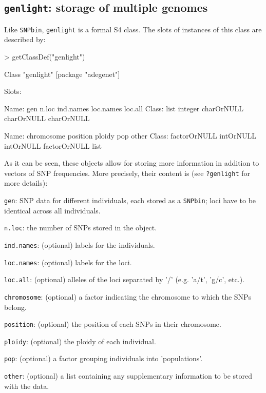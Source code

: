 \documentclass{article}
\newcommand{\code}[1]{{{\tt #1}}}
\begin{document}
\subsection{\code{genlight}: storage of multiple genomes}

Like \texttt{SNPbin}, \texttt{genlight} is a formal S4 class.
The slots of instances of this class are described by:
\begin{Schunk}
\begin{Sinput}
> getClassDef("genlight")
\end{Sinput}
\begin{Soutput}
Class "genlight" [package "adegenet"]

Slots:
                                                                       
Name:           gen        n.loc    ind.names    loc.names      loc.all
Class:         list      integer   charOrNULL   charOrNULL   charOrNULL
                                                                       
Name:    chromosome     position       ploidy          pop        other
Class: factorOrNULL    intOrNULL    intOrNULL factorOrNULL         list
\end{Soutput}
\end{Schunk}
As it can be seen, these objects allow for storing more information in addition to vectors of SNP frequencies.
More precisely, their content is (see \texttt{?genlight} for more details):
\begin{description}
  \item \texttt{gen}: SNP data for different individuals, each stored as a \texttt{SNPbin}; loci
    have to be identical across all individuals.
  \item \texttt{n.loc}: the number of SNPs stored in the object.
  \item \texttt{ind.names}: (optional) labels for the individuals.
  \item \texttt{loc.names}: (optional) labels for the loci.
  \item \texttt{loc.all}: (optional) alleles of the loci separated by '/' (e.g. 'a/t', 'g/c', etc.).
  \item \texttt{chromosome}: (optional) a factor indicating the chromosome to which the SNPs belong.
  \item \texttt{position}: (optional) the position of each SNPs in their chromosome.
  \item \texttt{ploidy}: (optional) the ploidy of each individual.
  \item \texttt{pop}: (optional) a factor grouping individuals into 'populations'.
  \item \texttt{other}: (optional) a list containing any supplementary information to be stored with
    the data.
\end{description}
\end{document}
